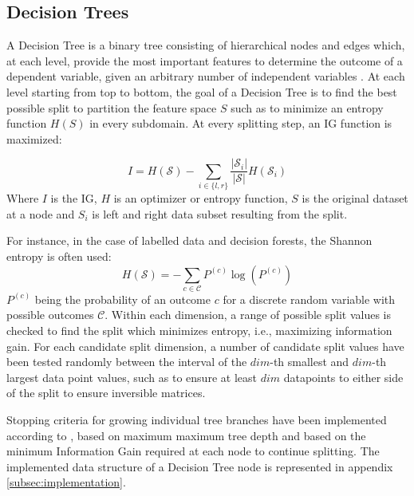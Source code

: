 \documentclass[10pt]{article}
\begin{document}
\subsection{Decision Trees}
A Decision Tree is a binary tree consisting of hierarchical nodes and edges which, at each level, provide the most important features to determine the outcome of a dependent variable, given an arbitrary number of independent variables \cite{decisionForests-MSR}. At each level starting from top to bottom, the goal of a Decision Tree is to find the best possible split to partition the feature space $S$ such as to minimize an entropy function $H(S)$ in every subdomain. At every splitting step, an \acrlong{IG} function is maximized:

\begin{equation}
    \label{eq:ig}
    I = H(\mathcal{S})-\sum_{i\in \{l,r\}}\frac{|\mathcal{S}_i|}{|\mathcal{S}|}H(\mathcal{S}_i)
\end{equation}
Where $I$ is the \acrlong{IG}, $H$ is an optimizer or entropy function, $S$ is the original dataset at a node and $S_i$ is left and right data subset resulting from the split.

For instance, in the case of labelled data and decision forests, the Shannon entropy is often used:
\begin{equation}
    H(\mathcal{S}) = -\sum_{c\in\mathcal{C}}P^{(c)}\log(P^{(c)})
\end{equation}
$P^{(c)}$ being the probability of an outcome $c$ for a discrete random variable with possible outcomes $\mathcal{C}$. Within each dimension, a range of possible split values is checked to find the split which minimizes entropy, i.e., maximizing information gain. For each candidate split dimension, a number of candidate split values have been tested randomly between the interval of the $dim$-th smallest and $dim$-th largest data point values, such as to ensure at least $dim$ datapoints to either side of the split to ensure inversible matrices.

Stopping criteria for growing individual tree branches have been implemented according to \cite{decisionForests-MSR}, based on maximum maximum tree depth and based on the minimum Information Gain required at each node to continue splitting. The implemented data structure of a Decision Tree node is represented in appendix \ref{subsec:implementation}.
\end{document}
